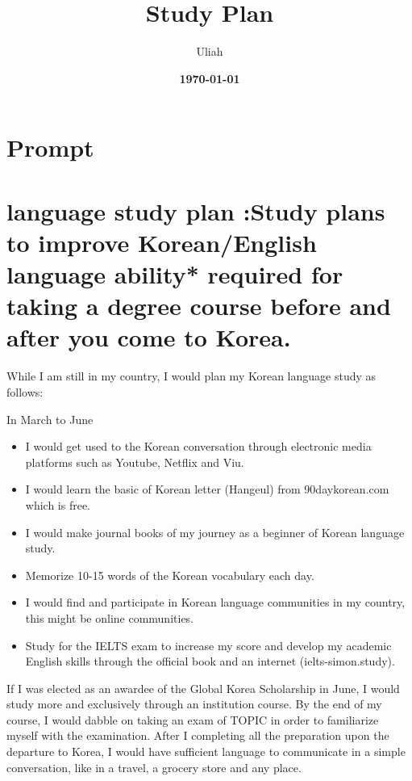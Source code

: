 \documentclass[12pt]{simart} %
\title{
\textbf{ Study Plan} \\
} %
\date{\textbf{\today}}
\author{Uliah}
\begin{document}
\maketitle
\section{Prompt}

\section{language study plan :Study plans to improve Korean/English language ability* required for taking a degree course before and after you come to Korea.}

While I am still in my country, I would plan my Korean language study as follows:

In March to June
\begin{itemize}
    \item I would get used to the Korean conversation through electronic media platforms such as Youtube, Netflix and Viu.
    \item I would learn the basic of Korean letter (Hangeul) from 90daykorean.com which is free.
    \item I would make journal books of my journey as a beginner of Korean language study.
    \item Memorize 10-15 words of the Korean vocabulary each day.
    \item I would find and participate in Korean language communities in my country, this might be online communities.
    \item Study for the IELTS exam to increase my score and develop my academic English skills through the official book and an internet (ielts-simon.study).
\end{itemize}

If I was elected as an awardee of the Global Korea Scholarship in June, I would study more and exclusively through an institution course. By the end of my course, I would dabble on taking an exam of TOPIC in order to familiarize myself with the examination. After I completing all the preparation upon the departure to Korea, I would have sufficient language to communicate in a simple conversation, like in a travel, a grocery store and any place.
\end{document}
